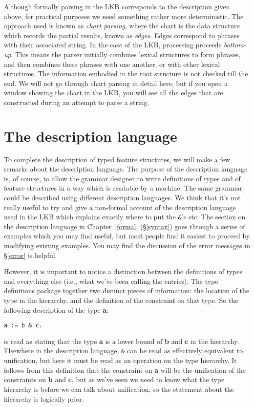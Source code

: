 \documentclass[12pt]{report}
\begin{document}
Although formally parsing in the LKB corresponds to the description
given above, for practical purposes we need something rather more
deterministic.  The approach used is known as {\it chart parsing},
where the chart is the data structure which records the partial results,
known as {\it edges}.  Edges correspond to phrases with their associated
string.
In the case of the LKB, processing proceeds
{\it bottom-up}.  This means the parser initially
combines lexical structures to form phrases,
and then combines these phrases with one another, or
with other lexical structures.  The information embodied in
the root structure is not checked till the end.
We will not go through chart parsing in detail
here, but if you open a window
showing the chart in the LKB, you will see all the edges that
are constructed during an attempt to parse a string.

\section{The description language}

To complete the description of typed feature structures,
we will make a few remarks about the description language.
The purpose of the description language is, of course,
to allow the grammar designer to write definitions of types and of
feature structures in a way which is readable
by a machine.  The same grammar could be described using
different description languages.
We think that
it's not really useful to try and give a
non-formal account of the description language used in the LKB 
which explains exactly where to put the \verb+&+'s etc.
The section on the description language in Chapter~\ref{formal}
(\S\ref{syntax}) goes through a series of examples
which you may find useful, but most people find it easiest
to proceed by modifying existing examples.  You may find the
discussion of the error messages in \S\ref{error} is helpful.

However, it is important to
notice a distinction between the definitions of types
and everything else (i.e., what we've been calling the entries).
The type definitions
package together two distinct pieces of information: the
location of the type in the hierarchy, 
and the definition of the
constraint on that type.  So the following description of the type {\bf a}:
\begin{verbatim}
a := b & c.
\end{verbatim}
is read as stating that the type {\bf a} is a
lower bound of {\bf b} and {\bf c} in the hierarchy.  
Elsewhere in the description language,
\verb+&+ can be read as effectively equivalent to unification,
but here it must be read as an operation on the type
hierarchy.
It follows from this definition
that the constraint on {\bf a} will be the unification of 
the constraints on {\bf b} and {\bf c}, but as we've seen
we need to know what the type hierarchy is before we can 
talk about unification, so the statement about the hierarchy
is logically prior.
\end{document}
